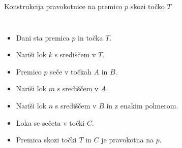 \begin{frame}{Konstrukcija pravokotnice na premico $p$ skozi točko $T$}
	\begin{columns}
			
		  \begin{itemize}
			 \item <1-> Dani sta premica $p$ in točka $T$.
			 \item <2-> Nariši lok $k$ s središčem v $T$.
			 \item <3-> Premico $p$ seče v točkah $A$ in $B$.
			 \item <4-> Nariši lok $m$ s središčem v $A$.
			 \item <5-> Nariši lok $n$ s središčem v $B$ in z enakim polmerom.
			 \item <6-> Loka se sečeta v točki $C$.
			 \item <7-> Premica skozi točki $T$ in $C$ je pravokotna na $p$.
		  \end{itemize}

		

			
\end{columns}
\end{frame}
